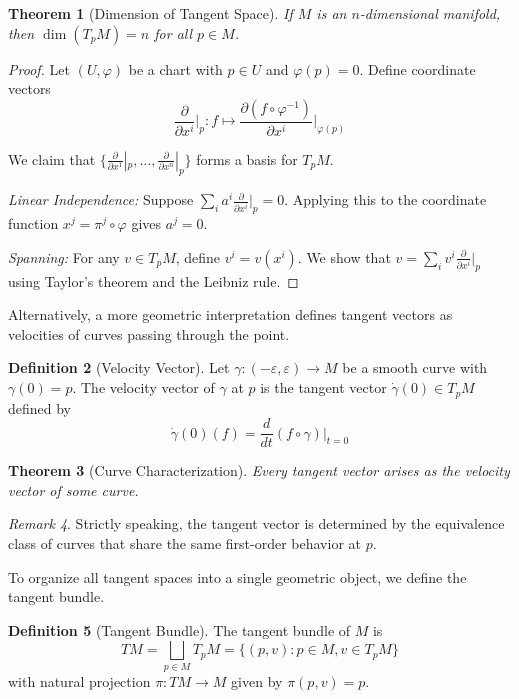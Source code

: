 \documentclass{article}
\theoremstyle{plain}
\newtheorem{theorem}{Theorem}[section]
\theoremstyle{definition}
\newtheorem{definition}[theorem]{Definition}
\theoremstyle{remark}
\newtheorem{remark}[theorem]{Remark}
\begin{document}
\begin{theorem}[Dimension of Tangent Space]
If $M$ is an $n$-dimensional manifold, then $\dim(T_p M) = n$ for all $p \in M$.
\end{theorem}

\begin{proof}
Let $(U, \varphi)$ be a chart with $p \in U$ and $\varphi(p) = 0$. Define coordinate vectors
\[\frac{\partial}{\partial x^i}\bigg|_p : f \mapsto \frac{\partial(f \circ \varphi^{-1})}{\partial x^i}\bigg|_{\varphi(p)}\]

We claim that $\{\frac{\partial}{\partial x^1}|_p, \ldots, \frac{\partial}{\partial x^n}|_p\}$ forms a basis for $T_p M$.

\textit{Linear Independence:} Suppose $\sum_i a^i \frac{\partial}{\partial x^i}|_p = 0$. Applying this to the coordinate function $x^j = \pi^j \circ \varphi$ gives $a^j = 0$.

\textit{Spanning:} For any $v \in T_p M$, define $v^i = v(x^i)$. We show that $v = \sum_i v^i \frac{\partial}{\partial x^i}|_p$ using Taylor's theorem and the Leibniz rule.
\end{proof}

Alternatively, a more geometric interpretation defines tangent vectors as velocities of curves passing through the point.

\begin{definition}[Velocity Vector]
Let $\gamma: (-\varepsilon, \varepsilon) \to M$ be a smooth curve with $\gamma(0) = p$. The velocity vector of $\gamma$ at $p$ is the tangent vector $\dot{\gamma}(0) \in T_p M$ defined by
\[\dot{\gamma}(0)(f) = \frac{d}{dt}(f \circ \gamma)\bigg|_{t=0}\]
\end{definition}

\begin{theorem}[Curve Characterization]
Every tangent vector arises as the velocity vector of some curve. 
\end{theorem}

\begin{remark}
Strictly speaking, the tangent vector is determined by the equivalence class of curves that share the same first-order behavior at $p$.
\end{remark}
To organize all tangent spaces into a single geometric object, we define the tangent bundle.

\begin{definition}[Tangent Bundle]
The tangent bundle of $M$ is
\[TM = \bigsqcup_{p \in M} T_p M = \{(p, v) : p \in M, v \in T_p M\}\]
with natural projection $\pi: TM \to M$ given by $\pi(p, v) = p$.
\end{definition}
\end{document}
